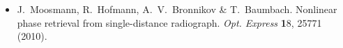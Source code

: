 \documentclass[
twoside,
openright,
titlepage,
numbers=noenddot,
headinclude,
fleqn,
a4paper,
footinclude=true,
cleardoublepage=empty,
abstractoff,
BCOR=5mm,
paper=a4,
fontsize=11pt,
british,ngerman,american,
]{scrreprt}
\begin{document}
\begin{itemize}[leftmargin=*]
\item[] J.~Moosmann, R.~Hofmann, A.~V.~Bronnikov \&
  T.~Baumbach. Nonlinear phase retrieval from single-distance
  radiograph. \emph{Opt.  Express} {\textbf 18}, 25771 (2010).




\end{itemize}

\cleardoublepage

{}
\setcounter{tocdepth}{2} %
\setcounter{secnumdepth}{3} %
\manualmark
\markboth{\spacedlowsmallcaps{\contentsname}}
{\spacedlowsmallcaps{\contentsname}}
\tableofcontents 
{}
\renewcommand{\chaptermark}[1]{\markboth{\spacedlowsmallcaps{#1}}
  {\spacedlowsmallcaps{#1}}}
\renewcommand{\sectionmark}[1]{\markright{\thesection\enspace\spacedlowsmallcaps{#1}}}

\cleardoublepage
{}

\end{document}
